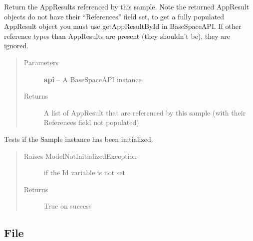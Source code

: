 \documentclass[letterpaper,10pt,english]{sphinxmanual}
\begin{document}
\begin{fulllineitems}
\begin{fulllineitems}
\label{Available modules:BaseSpacePy.model.Sample.Sample.getReferencedAppResults}
Return the AppResults referenced by this sample. 
Note the returned AppResult objects do not have their ``References'' field set, 
to get a fully populated AppResult object you must use getAppResultById in BaseSpaceAPI.
If other reference types than AppResults are present (they shouldn't be), they are ignored.
\begin{quote}\begin{description}
\item[{Parameters}] \leavevmode
\textbf{api} -- A BaseSpaceAPI instance

\item[{Returns}] \leavevmode
A list of AppResult that are referenced by this sample (with their References field not populated)

\end{description}\end{quote}

\end{fulllineitems}


\begin{fulllineitems}
\label{Available modules:BaseSpacePy.model.Sample.Sample.isInit}
Tests if the Sample instance has been initialized.
\begin{quote}\begin{description}
\item[{Raises ModelNotInitializedException}] \leavevmode
if the Id variable is not set

\item[{Returns}] \leavevmode
True on success

\end{description}\end{quote}

\end{fulllineitems}


\end{fulllineitems}



\subsection{File}
\label{Available modules:file}
\end{document}
